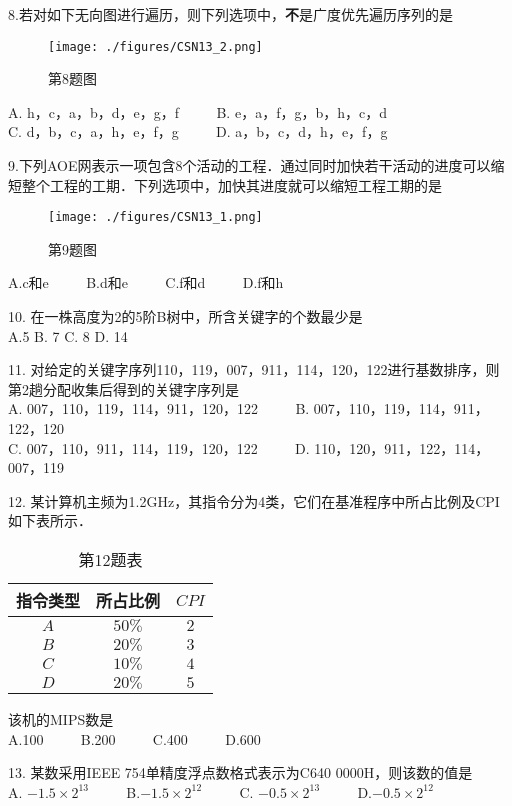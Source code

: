 8.若对如下无向图进行遍历，则下列选项中，\textbf{不}是广度优先遍历序列的是 \\
\begin{figure}[ht]
\centering
\texttt{[image: ./figures/CSN13\_2.png]}
\caption{第8题图} \label{CSN13_fig2}
\end{figure}
A. h，c，a，b，d，e，g，f $\qquad$ B. e，a，f，g，b，h，c，d \\
C. d，b，c，a，h，e，f，g $\qquad$ D. a，b，c，d，h，e，f，g 

9.下列AOE网表示一项包含8个活动的工程．通过同时加快若干活动的进度可以缩短整个工程的工期．下列选项中，加快其进度就可以缩短工程工期的是 \\
\begin{figure}[ht]
\centering
\texttt{[image: ./figures/CSN13\_1.png]}
\caption{第9题图} \label{CSN13_fig1}
\end{figure}
A.c和e  $\qquad$ B.d和e $\qquad$ C.f和d $\qquad$ D.f和h

10.	在一株高度为2的5阶B树中，所含关键字的个数最少是 \\
A.5                   B. 7                C. 8                D. 14 

11.	对给定的关键字序列110，119，007，911，114，120，122进行基数排序，则第2趟分配收集后得到的关键字序列是 \\
A. 007，110，119，114，911，120，122 $\qquad$ B. 007，110，119，114，911，122，120 \\
C. 007，110，911，114，119，120，122 $\qquad$ D. 110，120，911，122，114，007，119

12.	某计算机主频为1.2GHz，其指令分为4类，它们在基准程序中所占比例及CPI如下表所示． \\
 \begin{table}[ht]
 \centering
 \caption{第12题表}\label{CSN13_tab1}
 \begin{tabular}{|c|c|c|}
 \hline
 指令类型 & 所占比例 & $CPI$ \\
 \hline
 $A$ & $50\%$ & $2$ \\
 \hline
 $B$ & $20\%$ & $3$ \\
 \hline
 $C$ & $10\%$ & $4$ \\
 \hline
 $D$ & $20\%$ & $5$ \\
 \hline
 \end{tabular}
 \end{table}
该机的MIPS数是  \\
A.100 $\qquad$ B.200 $\qquad$ C.400 $\qquad$ D.600

13.	某数采用IEEE 754单精度浮点数格式表示为C640 0000H，则该数的值是 \\ 
A. $-1.5\times2^{13}$ $\qquad$ B.$-1.5\times2^{12}$ $\qquad$ C. $-0.5\times2^{13}$ $\qquad$ D.$-0.5\times2^{12}$

